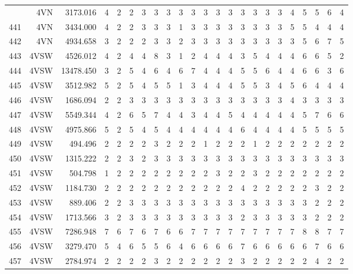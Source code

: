 \documentclass[12pt]{article}\usepackage[]{graphicx}\usepackage[]{color}
\begin{document}
\begin{landscapepage}
\begin{longtable}[t]{crrrrrrrrrrrrrrrcrrrrrr}
\endfoot
\bottomrule
\endlastfoot
440 & 4VN & 3173.016 & 4 & 2 & 2 & 3 & 3 & 3 & 3 & 3 & 3 & 3 & 3 & 3 & 3 & 3 & 3 & 4 & 5 & 5 & 6 & 4\\
441 & 4VN & 3434.000 & 4 & 2 & 2 & 3 & 3 & 3 & 1 & 3 & 3 & 3 & 3 & 3 & 3 & 3 & 3 & 5 & 5 & 4 & 4 & 4\\
442 & 4VN & 4934.658 & 3 & 2 & 2 & 2 & 3 & 3 & 2 & 3 & 3 & 3 & 3 & 3 & 3 & 3 & 3 & 3 & 5 & 6 & 7 & 5\\
443 & 4VSW & 4526.012 & 4 & 2 & 4 & 4 & 8 & 3 & 1 & 2 & 4 & 4 & 4 & 3 & 5 & 4 & 4 & 4 & 6 & 6 & 5 & 2\\
444 & 4VSW & 13478.450 & 3 & 2 & 5 & 4 & 6 & 4 & 6 & 7 & 4 & 4 & 4 & 5 & 5 & 6 & 4 & 4 & 6 & 6 & 3 & 6\\
445 & 4VSW & 3512.982 & 5 & 2 & 5 & 4 & 5 & 5 & 1 & 3 & 4 & 4 & 4 & 5 & 5 & 3 & 4 & 5 & 6 & 4 & 4 & 4\\
446 & 4VSW & 1686.094 & 2 & 2 & 3 & 3 & 3 & 3 & 3 & 3 & 3 & 3 & 3 & 3 & 3 & 3 & 3 & 4 & 3 & 3 & 3 & 3\\
447 & 4VSW & 5549.344 & 4 & 2 & 6 & 5 & 7 & 4 & 4 & 3 & 4 & 4 & 5 & 4 & 4 & 4 & 4 & 4 & 5 & 7 & 6 & 6\\
448 & 4VSW & 4975.866 & 5 & 2 & 5 & 4 & 5 & 4 & 4 & 4 & 4 & 4 & 4 & 6 & 4 & 4 & 4 & 4 & 5 & 5 & 5 & 5\\
449 & 4VSW & 494.496 & 2 & 2 & 2 & 2 & 3 & 2 & 2 & 2 & 1 & 2 & 2 & 2 & 1 & 2 & 2 & 2 & 2 & 2 & 2 & 2\\
450 & 4VSW & 1315.222 & 2 & 2 & 3 & 2 & 3 & 3 & 3 & 3 & 3 & 3 & 3 & 3 & 3 & 3 & 3 & 3 & 3 & 3 & 3 & 3\\
451 & 4VSW & 504.798 & 1 & 2 & 2 & 2 & 2 & 2 & 2 & 2 & 2 & 3 & 2 & 2 & 3 & 2 & 2 & 2 & 2 & 2 & 2 & 2\\
452 & 4VSW & 1184.730 & 2 & 2 & 2 & 2 & 2 & 2 & 2 & 2 & 2 & 2 & 2 & 4 & 2 & 2 & 2 & 2 & 2 & 3 & 2 & 2\\
453 & 4VSW & 889.406 & 2 & 2 & 3 & 3 & 3 & 3 & 3 & 3 & 3 & 3 & 3 & 3 & 3 & 3 & 3 & 3 & 3 & 2 & 2 & 2\\
454 & 4VSW & 1713.566 & 3 & 2 & 3 & 3 & 3 & 3 & 3 & 3 & 3 & 3 & 3 & 2 & 3 & 3 & 3 & 3 & 3 & 2 & 2 & 2\\
455 & 4VSW & 7286.948 & 7 & 6 & 7 & 6 & 7 & 6 & 6 & 7 & 7 & 7 & 7 & 7 & 7 & 7 & 7 & 7 & 8 & 8 & 7 & 7\\
456 & 4VSW & 3279.470 & 5 & 4 & 6 & 5 & 5 & 6 & 4 & 6 & 6 & 6 & 6 & 7 & 6 & 6 & 6 & 6 & 6 & 7 & 6 & 6\\
457 & 4VSW & 2784.974 & 2 & 2 & 2 & 2 & 3 & 2 & 2 & 2 & 2 & 2 & 2 & 3 & 2 & 2 & 2 & 2 & 2 & 4 & 2 & 2\\

\end{longtable}
\end{landscapepage}
\end{document}
